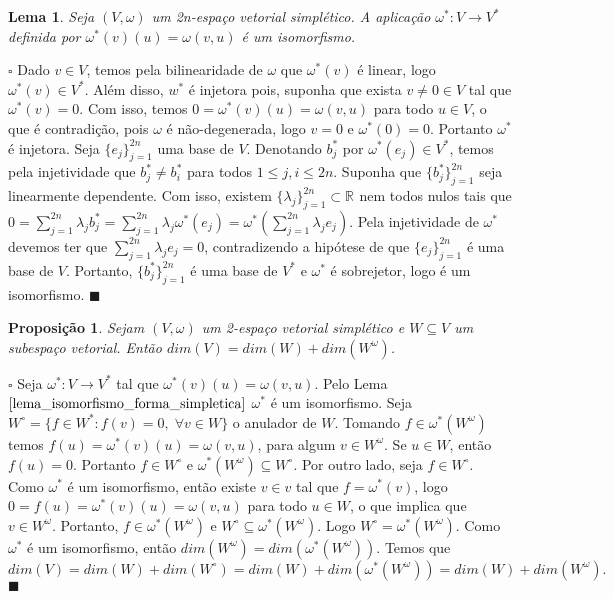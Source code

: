 \documentclass[12pt]{book}
\newtheorem{lema}[teorema]{Lema}
\newtheorem{proposicao}[teorema]{Proposição}
\newenvironment{prova}[1]{$\square$ #1}{\hfill$\blacksquare$}
\newcommand{\colecaofinita}[2]{\{#1_{j} \}_{j=1}^{#2}}
\newcommand{\espacoSimpleticoOrtogonal}[1]{#1^{\omega}}
\newcommand{\real}[1]{\mathbb{R}^{#1}}
\newcommand{\reta}{\real{}}
\begin{document}
	\begin{lema}\label{lema_isomorfismo_forma_simpletica}
		Seja $(V,\omega)$ um 2n-espaço vetorial simplético. A aplicação $\omega^{*}:V\to V^{*}$ definida por $\omega^{*}(v)(u) = \omega(v,u)$ é um isomorfismo.
	\end{lema}
	\begin{prova}
		Dado $v \in V$, temos pela bilinearidade de $\omega$ que $\omega^{*}(v)$ é linear, logo $\omega^{*}(v) \in V^{*}$. Além disso, $w^{*}$ é injetora pois, suponha 
		que exista $v\neq 0 \in V$ tal que $\omega^{*}(v) = 0$. Com isso, temos $0= \omega^{*}(v)(u) = \omega(v,u)$ para todo $u \in V$, o que é contradição, pois $\omega$ é não-degenerada, logo $v =0$ e $\omega^{*}(0) = 0$. Portanto $\omega^{*}$ é injetora. Seja $\colecaofinita{e}{2n}$ uma base de $V$. Denotando $b^{*}_{j}$ por $\omega^{*}(e_{j}) \in V^{*}$, temos pela injetividade que $b^{*}_{j} \neq b^{*}_{i}$ para todos $1\leq j,i\leq 2n$. Suponha que $\colecaofinita{b^{*}}{2n}$ seja linearmente dependente. Com isso, existem $\colecaofinita{\lambda}{2n} \subset \reta$ nem todos nulos tais que $0=\sum_{j=1}^{2n}\lambda_{j}b^{*}_{j} = \sum_{j=1}^{2n}\lambda_{j}\omega^{*}(e_{j}) = \omega^{*}(\sum_{j=1}^{2n}\lambda_{j}e_{j})$. Pela injetividade de $\omega^{*}$ devemos ter que $\sum_{j=1}^{2n}\lambda_{j}e_{j} = 0$, contradizendo a hipótese de que $\colecaofinita{e}{2n}$ é uma base de $V$. Portanto, $\colecaofinita{b^{*}}{2n}$ é uma base de $V^{*}$ e $\omega^{*}$ é sobrejetor, logo é um isomorfismo.
	\end{prova}
	
	\begin{proposicao}\label{proposicao_dimensao_subespaco_simpletico}
		Sejam $(V,\omega)$ um 2-espaço vetorial simplético e $W \subseteq V$ um subespaço vetorial. Então $dim(V) = dim(W) + dim(\espacoSimpleticoOrtogonal{W})$.
	\end{proposicao}
	\begin{prova}
		Seja $\omega^{*}: V \to V^{*}$ tal que $\omega^{*}(v)(u) = \omega(v,u)$. Pelo Lema $\ref{lema_isomorfismo_forma_simpletica}$ $\omega^{*}$ é um isomorfismo. Seja $W^{\circ}=\{f\in W^{*}: f(v) = 0,\; \forall v\in W \}$ o anulador de $W$. Tomando $f \in \omega^{*}(\espacoSimpleticoOrtogonal{W})$ temos $f(u) = \omega^{*}(v)(u)=\omega(v,u)$, para algum $v \in \espacoSimpleticoOrtogonal{W}$. Se $u\in W$, então $f(u) = 0$. Portanto $f \in W^{\circ}$ e  $\omega^{*}(\espacoSimpleticoOrtogonal{W})\subseteq W^{\circ}$. Por outro lado, seja $f \in W^{\circ}$. Como $\omega^{*}$ é um isomorfismo, então existe $v \in v$ tal que $f = \omega^{*}(v)$, logo $0=f(u) = \omega^{*}(v)(u) = \omega(v,u)$ para todo $u \in W$, o que implica que $v \in \espacoSimpleticoOrtogonal{W}$. Portanto, $f \in \omega^{*}(\espacoSimpleticoOrtogonal{W})$ e $W^{\circ} \subseteq \omega^{*}(\espacoSimpleticoOrtogonal{W})$. Logo $W^{\circ} =\omega^{*}(\espacoSimpleticoOrtogonal{W})$.
		Como $\omega^{*}$ é um isomorfismo, então $dim(\espacoSimpleticoOrtogonal{W}) = dim(\omega^{*}(\espacoSimpleticoOrtogonal{W}))$. Temos que 
		$$
		dim(V) = dim(W)+dim(W^{\circ}) = dim(W)+dim(\omega^{*}(\espacoSimpleticoOrtogonal{W})) = dim(W)+dim(\espacoSimpleticoOrtogonal{W}).
		$$ 
	\end{prova}
	
\end{document}
